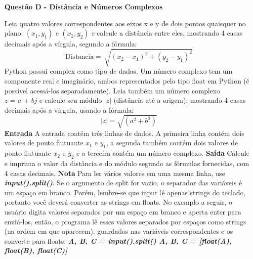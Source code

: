 \documentclass[a4paper, 12pt]{article}
\begin{document}
\newpage %
\begin{center}
\textbf{{\Large Questão D - Distância e Números Complexos}}
\end{center}
\vspace{5pt}
Leia quatro valores correspondentes aos eixos x e y de dois pontos quaisquer no plano: $(x_1,y_1)$ e 
$(x_2,y_2)$ e calcule a distância entre eles, mostrando 4 casas decimais após a vírgula, segundo a fórmula:
$$ \textrm{Distancia} = \, \sqrt{(x_2 - x_1 )^2 + (y_2 - y_1 )^2} $$
Python possui complex como tipo de dados. Um número complexo tem um componente real e imaginário, ambos representados pelo tipo float em Python (é possível acessá-los separadamente). Leia também um número complexo $\textit{z = a + bj}$ e calcule seu módulo $|z|$ (distância até a origem), mostrando 4 casas decimais após a vírgula, usando a fórmula: $$|z|= \sqrt{(a^2+b^2)}$$
\textbf{{\large Entrada}} \newline
A entrada contém três linhas de dados. A primeira linha contém dois valores de ponto flutuante $x_1$ e $y_1$, a segunda também contém dois valores de ponto flutuante $x_2$ e $y_2$ e a terceira contém um número complexo.
\newline \newline
\textbf{{\large Saída}} \newline
Calcule e imprima o valor da distância e do módulo segundo as fórmulas fornecidas, com 4 casas decimais.
\newline \newline
\textbf{{\large Nota}} \newline
Para ler vários valores em uma mesma linha, use \textbf{\textit{input().split()}}. Se o argumento de split for vazio, o separador das variáveis é um espaço em branco. Porém, lembre-se que input lê apenas strings do teclado, portanto você deverá converter as strings em floats. No exemplo a seguir, o usuário digita valores separados por um espaço em branco e aperta enter para enviá-los, então, o programa lê esses valores separados por espaços como strings (na ordem em que aparecem), guardados nas variáveis correspondentes e os converte para floats: \newline
\textbf{\textit{A, B, C = input().split() \newline
A, B, C = [float(A), float(B), float(C)]}}
\newline
\end{document}
